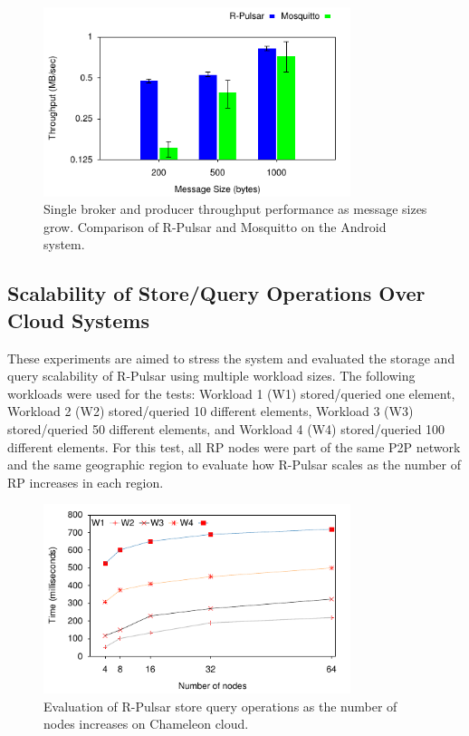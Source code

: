 \begin{figure}[h!]
  \centering
  \includegraphics[width=0.8\textwidth]{Results/ProducerPhone}
  \caption{Single broker and producer throughput performance as message sizes grow. Comparison of R-Pulsar and Mosquitto on the Android system.}
  \label{fig:ProducerPhone}

\end{figure}

\subsection{Scalability of Store/Query Operations Over Cloud Systems}

These experiments are aimed to stress the system and evaluated the storage and query scalability of R-Pulsar using multiple workload sizes. The following workloads were used for the tests: Workload 1 (W1) stored/queried one element, Workload 2 (W2) stored/queried 10 different elements, Workload 3 (W3) stored/queried 50 different elements, and Workload 4 (W4) stored/queried 100 different elements. For this test, all RP nodes were part of the same P2P network and the same geographic region to evaluate how R-Pulsar scales as the number of RP increases in each region. 

\begin{figure}[h!]
  \centering
  \includegraphics[width=0.8\textwidth]{Results/ProducerLine.pdf}
  \caption{Evaluation of R-Pulsar store query operations as the number of nodes increases on Chameleon cloud.}
  \label{fig:ProducerLine}
\end{figure}

